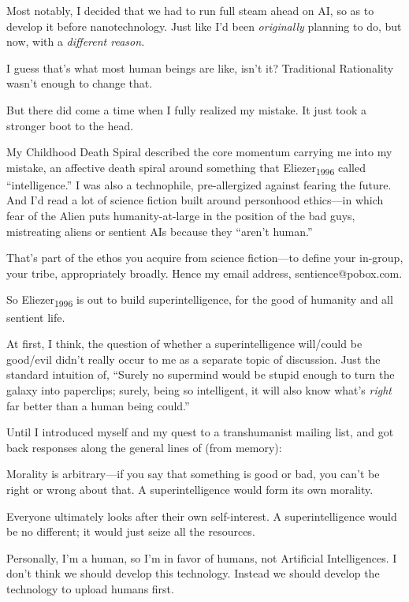 {
 Most notably, I decided that we had to run full steam ahead on AI,
so as to develop it before nanotechnology. Just like
I'd been \textit{originally} planning to do, but now,
with a \textit{different reason.}}

{
 I guess that's what most human beings are like,
isn't it? Traditional Rationality
wasn't enough to change that.}

{
 But there did come a time when I fully realized my mistake. It
just took a stronger boot to the head.}

\myendsectiontext


{
 My Childhood Death Spiral described the core momentum carrying me
into my mistake, an affective death spiral around something that
Eliezer\textsubscript{1996} called
``intelligence.'' I was also a
technophile, pre-allergized against fearing the future. And
I'd read a lot of science fiction built around
personhood ethics---in which fear of the Alien puts humanity-at-large
in the position of the bad guys, mistreating aliens or sentient AIs
because they ``aren't
human.'' }

{
 That's part of the ethos you acquire from science
fiction---to define your in-group, your tribe, appropriately broadly.
Hence my email address, sentience@pobox.com.}

{
 So Eliezer\textsubscript{1996} is out to build superintelligence,
for the good of humanity and all sentient life.}

{
 At first, I think, the question of whether a superintelligence
will/could be good/evil didn't really occur to me as a
separate topic of discussion. Just the standard intuition of,
``Surely no supermind would be stupid enough to turn
the galaxy into paperclips; surely, being so intelligent, it will also
know what's \textit{right} far better than a human
being could.''}

{
 Until I introduced myself and my quest to a transhumanist mailing
list, and got back responses along the general lines of (from memory):}

{
 Morality is arbitrary---if you say that something is good or bad,
you can't be right or wrong about that. A
superintelligence would form its own morality.}

{
 Everyone ultimately looks after their own self-interest. A
superintelligence would be no different; it would just seize all the
resources.}

{
 Personally, I'm a human, so I'm in
favor of humans, not Artificial Intelligences. I don't
think we should develop this technology. Instead we should develop the
technology to upload humans first.}

